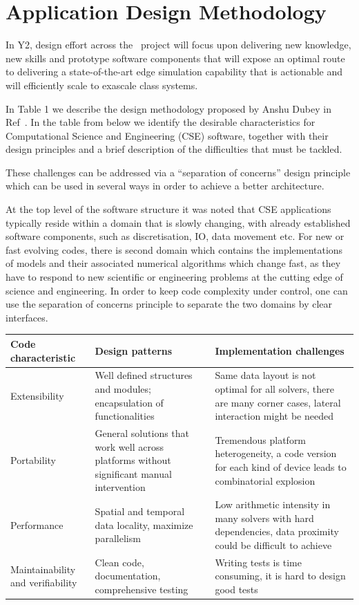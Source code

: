 \documentclass{article}
\begin{document}
\section*{{\Large{}{ \textbf{Application Design Methodology}}}}

In Y2, design effort across the \nep \   project will focus upon delivering new 
knowledge, new skills and prototype software components that will expose an optimal 
route to delivering a state-of-the-art edge simulation capability that is actionable 
and will efficiently scale to exascale class systems.

In Table 1 we describe the design methodology proposed by Anshu Dubey in Ref~\cite{ref [8]}. 
In the table from below we identify the desirable characteristics for Computational 
Science and Engineering (CSE) software, together with their design principles and 
a brief description of the difficulties that must be tackled.

These challenges can be addressed via a ``separation of concerns'' design principle 
which can be used in several ways in order to achieve a better architecture.

At the top level of the software structure it was noted that CSE applications typically 
reside within a domain that is slowly changing, with already established software 
components, such as discretisation, IO, data movement etc. For new or fast evolving 
codes, there is second domain which contains the implementations of models and 
their associated numerical algorithms which change fast, as they have to respond 
to new scientific or engineering problems at the cutting edge of science and engineering. 
In order to keep code complexity under control, one can use the separation of concerns 
principle to separate the two domains by clear interfaces. 

\begin{tabular}{|>{\raggedright}p{49pt}|>{\raggedright}p{115pt}|>{\raggedright}p{115pt}|}
\hline
Code characteristic & Design patterns & Implementation challenges\tabularnewline
\hline
Extensibility & Well defined structures and modules; encapsulation of functionalities & Same 
data layout is not optimal for all solvers, there are many corner cases, lateral 
interaction might be needed\tabularnewline
\hline
Portability & General solutions that work well across platforms without significant 
manual intervention & Tremendous platform heterogeneity, a code version for each 
kind of device leads to combinatorial explosion\tabularnewline
\hline
Performance & Spatial and temporal data locality, maximize parallelism & Low arithmetic 
intensity in many solvers with hard dependencies, data proximity could be difficult 
to achieve \tabularnewline
\hline
Maintainability and verifiability & Clean code, documentation, comprehensive testing & Writing 
tests is time consuming, it is hard to design good tests\tabularnewline
\hline
\end{tabular}
\end{document}
